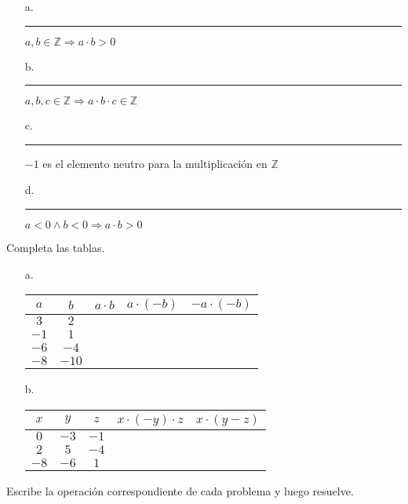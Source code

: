 \documentclass[spanish,letterpaper, 11pt, addpoints, answers]{exam}
\begin{document}
\begin{questions}
\begin{itemize}
  \item[a.] \rule{1cm}{0.4pt} $a,b\in \mathbb{Z}\Rightarrow a\cdot b>0$ 
  \item[b.] \rule{1cm}{0.4pt} $a,b,c\in \mathbb{Z}\Rightarrow a\cdot b\cdot c \in \mathbb{Z}$ 
  \item[c.] \rule{1cm}{0.4pt} $-1$ es el elemento neutro para la multiplicación en $\mathbb{Z}$ 
  \item[d.] \rule{1cm}{0.4pt} $a<0 \wedge b<0\Rightarrow a\cdot b>0$ 
\end{itemize}

\question Completa las tablas.

\begin{itemize}
  \item[a.]
\begin{center}
  \begin{tabular}{|c|c|>{\centering\arraybackslash}p{2.5cm}|>{\centering\arraybackslash}p{2.5cm}|>{\centering\arraybackslash}p{2.5cm}|}\hline
    $a$ & $b$ & $a\cdot b$ & $a\cdot (-b)$ & $-a\cdot (-b)$ \\ \hline
    $3$ & $2$ &&& \\ \hline
    $-1$ & $1$ &&& \\ \hline
    $-6$ & $-4$ &&& \\ \hline
    $-8$ & $-10$ &&& \\ \hline
  \end{tabular}
\end{center}
\vspace{0.5cm}
\item[b.]
\begin{center}
  \begin{tabular}{|c|c|c|>{\centering\arraybackslash}p{3.5cm}|>{\centering\arraybackslash}p{3.5cm}|}\hline
  $x$&$y$&$z$&$x\cdot (-y)\cdot z$&$x\cdot (y-z)$\\ \hline
  $0$&$-3$&$-1$&&\\ \hline
  $2$&$5$&$-4$&&\\ \hline
  $-8$&$-6$&$1$&&\\ \hline
  
    
  \end{tabular}
\end{center}
\end{itemize}

\question Escribe la operación correspondiente de cada problema y luego resuelve.


\end{questions}
\end{document}
